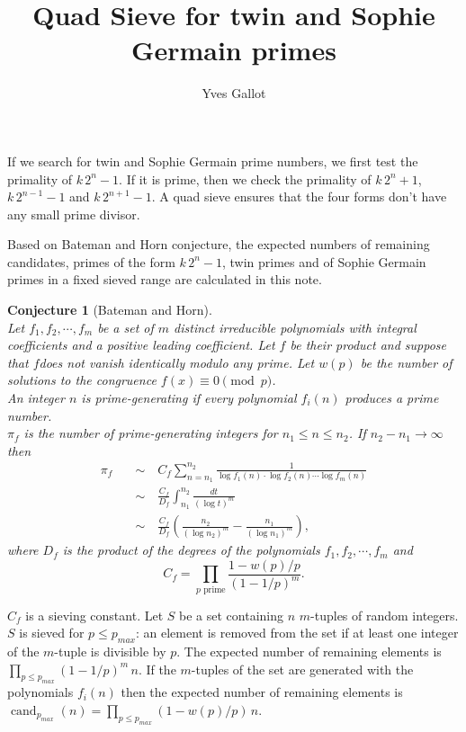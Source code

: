 \documentclass[a4paper, 12pt]{article}
\title{Quad Sieve for twin and Sophie Germain primes}
\author{Yves Gallot}
\DeclareMathOperator{\cand}{cand}
\theoremstyle{plain}
\newtheorem*{conjecture}{Conjecture}
\theoremstyle{definition}
\begin{document}
\maketitle

If we search for twin and Sophie Germain prime numbers, we first test the primality of $k\,2^n - 1$.
If it is prime, then we check the primality of $k\,2^n + 1$, $k\,2^{n-1} - 1$ and $k\,2^{n+1} - 1$.
A quad sieve ensures that the four forms don't have any small prime divisor.

\medskip

Based on Bateman and Horn conjecture, the expected numbers of remaining candidates,
primes of the form $k\,2^n - 1$, twin primes and of Sophie Germain primes in a fixed
sieved range are calculated in this note. 

\begin{conjecture}[Bateman and Horn]$ $\\
Let $f_1, f_2, \cdots, f_m$ be a set of $m$ distinct irreducible polynomials
with integral coefficients and a positive leading coefficient.
Let $f$ be their product and suppose that $f$does not vanish identically modulo any prime. 
Let $w(p)$ be the number of solutions to the congruence $f(x) \equiv 0 \pmod p$.\\
An integer $n$ is prime-generating if every polynomial $f_i(n)$ produces a prime number.\\
$\pi_f$ is the number of prime-generating integers for $n_1 \leq n \leq n_2$.
If $n_2 - n_1 \to \infty$ then
\begin{equation*}
\begin{split}
\pi_f \quad
 &\sim \quad C_f \sum_{n = n_1}^{n_2} \frac{1}{\log f_1(n) \cdot \log f_2(n) \cdots \log f_m(n)} \\
 &\sim \quad \frac{C_f}{D_f} \int_{n_1}^{n_2} \frac{dt}{\left(\log t\right)^m}\\
 &\sim \quad \frac{C_f}{D_f} \left( \frac{n_2}{\left(\log n_2\right)^m}
           - \frac{n_1}{\left(\log n_1\right)^m}\right),
\end{split}
\end{equation*}
where $D_f$ is the product of the degrees of the polynomials $f_1, f_2, \cdots, f_m$ and
\[C_f = \prod_{p\text{ prime}} \frac{1 - w(p)/p}{\left(1 - 1/p\right)^m}.\]
\end{conjecture}

\medskip

$C_f$ is a sieving constant. Let $S$ be a set containing $n$ $m$-tuples of random integers.
$S$ is sieved for $p \leq p_{max}$: an element is removed from the set if at least one
integer of the $m$-tuple is divisible by $p$. The expected number of remaining elements
is $\prod_{p\leq p_{max}}\left(1 - 1/p\right)^m\,n$. If the $m$-tuples of the set are
generated with the polynomials $f_i(n)$ then the expected number of remaining elements
is $\cand_{p_{max}}(n) = \prod_{p\leq p_{max}}\left(1 - w(p)/p\right)\,n$.
\end{document}
